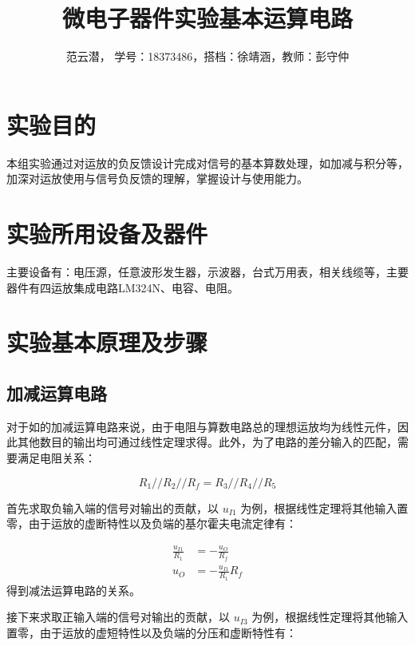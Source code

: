 \documentclass[lang=cn,11pt,a4paper,cite=authoryear]{elegantpaper}
\title{微电子器件实验\quad 基本运算电路}
\author{范云潜， 学号：18373486，搭档：徐靖涵，教师：彭守仲}
\institute{微电子学院 184111 班}
\date{\zhtoday}
\begin{document}
\maketitle


\section{实验目的}

本组实验通过对运放的负反馈设计完成对信号的基本算数处理，如加减与积分等，加深对运放使用与信号负反馈的理解，掌握设计与使用能力。

\section{实验所用设备及器件}

主要设备有：电压源，任意波形发生器，示波器，台式万用表，相关线缆等，主要器件有四运放集成电路LM324N、电容、电阻。

\section{实验基本原理及步骤}

\subsection{加减运算电路}

对于如的加减运算电路来说，由于电阻与算数电路总的理想运放均为线性元件，因此其他数目的输出均可通过线性定理求得。此外，为了电路的差分输入的匹配，需要满足电阻关系：

\begin{equation}\label{eq1}
    R_1 // R_2 // R_f = R_3 // R_4 // R_5 
\end{equation}


首先求取负输入端的信号对输出的贡献，以 \(u_{I1}\) 为例，根据线性定理将其他输入置零，由于运放的虚断特性以及负端的基尔霍夫电流定律有：

\begin{equation}
    \begin{aligned}
        \frac{u_{I1}}{R_1} &= -\frac{u_O}{R_f} \\ 
        u_O &= -\frac{u_{I1}}{R_1} R_f
    \end{aligned}
\end{equation}
得到减法运算电路的关系。

接下来求取正输入端的信号对输出的贡献，以 \(u_{I3}\) 为例，根据线性定理将其他输入置零，由于运放的虚短特性以及负端的分压和虚断特性有：
\end{document}
